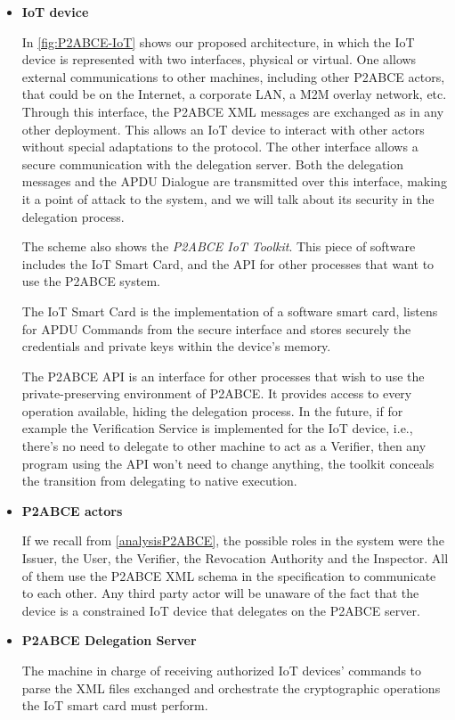 \documentclass[journal]{IEEEtran}
\begin{document}
\begin{itemize}
	
	\item \textbf{IoT device}
	
	In \autoref{fig:P2ABCE-IoT} shows our proposed architecture, in which the IoT device is represented with two interfaces, physical or virtual. One allows external communications to other machines, including other P2ABCE actors, that could be on the Internet, a corporate LAN, a M2M overlay network, etc. Through this interface, the P2ABCE XML messages are exchanged as in any other deployment. This allows an IoT device to interact with other actors without special adaptations to the protocol. The other interface allows a secure communication with the delegation server. Both the delegation messages and the APDU Dialogue are transmitted over this interface, making it a point of attack to the system, and we will talk about its security in the delegation process.
	
	The scheme also shows the \textit{P2ABCE IoT Toolkit}. This piece of software includes the IoT Smart Card, and the API for other processes that want to use the P2ABCE system.
	
	The IoT Smart Card is the implementation of a software smart card, listens for APDU Commands from the secure interface and stores securely the credentials and private keys within the device's memory.
	
	The P2ABCE API is an interface for other processes that wish to use the private-preserving environment of P2ABCE. It provides access to every operation available, hiding the delegation process. In the future, if for example the Verification Service is implemented for the IoT device, i.e., there's no need to delegate to other machine to act as a Verifier, then any program using the API won't need to change anything, the toolkit conceals the transition from delegating to native execution.
	
	
	\item \textbf{P2ABCE actors}
	
	If we recall from \autoref{analysisP2ABCE}, the possible roles in the system were the Issuer, the User, the Verifier, the Revocation Authority and the Inspector. All of them use the P2ABCE XML schema in the specification to communicate to each other. Any third party actor will be unaware of the fact that the device is a constrained IoT device that delegates on the P2ABCE server.
	
	
	
	\item \textbf{P2ABCE Delegation Server}
	
	The machine in charge of receiving authorized IoT devices' commands to parse the XML files exchanged and orchestrate the cryptographic operations the IoT smart card must perform.
	
	
\end{itemize}
\end{document}
